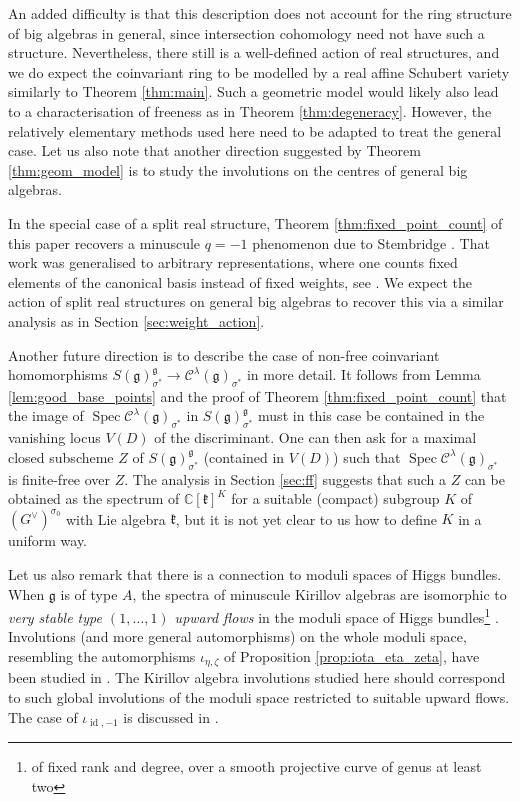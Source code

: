 \documentclass{amsart}
\newcommand{\C}{\mathbb{C}}
\newcommand{\Kir}{\mathcal{C}}
\newcommand{\g}{\mathfrak{g}}
\newcommand{\id}{\operatorname{id}}
\newcommand{\kay}{\mathfrak{k}}
\newcommand{\Spec}{\operatorname{Spec}}
\theoremstyle{definition}
\theoremstyle{plain}
\theoremstyle{remark}
\begin{document}
An added difficulty is that this description does not account for the ring structure of big algebras in general, since intersection cohomology need not have such a structure. Nevertheless, there still is a well-defined action of real structures, and we do expect the coinvariant ring to be modelled by a real affine Schubert variety similarly to Theorem \ref{thm:main}. Such a geometric model would likely also lead to a characterisation of freeness as in Theorem \ref{thm:degeneracy}.
However, the relatively elementary methods used here need to be adapted to treat the general case. Let us also note that another direction suggested by Theorem \ref{thm:geom_model} is to study the involutions on the centres of general big algebras.

In the special case of a split real structure, Theorem \ref{thm:fixed_point_count} of this paper recovers a minuscule $q=-1$ phenomenon due to Stembridge \cite{Stembridge1994_minuscule}. That work was generalised to arbitrary representations, where one counts fixed elements of the canonical basis instead of fixed weights, see \cite{Stembridge1996_canonical}. We expect the action of split real structures on general big algebras to recover this via a similar analysis as in Section \ref{sec:weight_action}. 

Another future direction is to describe the case of non-free coinvariant homomorphisms $S(\g)^\g_{\sigma^*} \to \Kir^\lambda(\g)_{\sigma^*}$ in more detail. It follows from Lemma \ref{lem:good_base_points} and the proof of Theorem \ref{thm:fixed_point_count} that the image of $\Spec \Kir^\lambda(\g)_{\sigma^*}$ in  $S(\g)^\g_{\sigma^*}$ must in this case be contained in the vanishing locus $V(D)$ of the discriminant. One can then ask for a maximal closed subscheme $Z$ of $S(\g)^\g_{\sigma^*}$ (contained in $V(D)$) such that $\Spec \Kir^\lambda(\g)_{\sigma^*}$ is finite-free over $Z$. The analysis in Section \ref{sec:ff} suggests that such a $Z$ can be obtained as the spectrum of $\C[\kay]^K$ for a suitable (compact) subgroup $K$ of $(G^\vee)^{\sigma_0}$ with Lie algebra $\kay$, but it is not yet clear to us how to define $K$ in a uniform way.

Let us also remark that there is a connection to moduli spaces of Higgs bundles. When $\g$ is of type $A$, the spectra of minuscule Kirillov algebras are isomorphic to \emph{very stable type $(1,\ldots, 1)$ upward flows} in the moduli space of Higgs bundles\footnote{of fixed rank and degree, over a smooth projective curve of genus at least two} \cite[\S4]{GH2024_even_very_stable}. Involutions (and more general automorphisms) on the whole moduli space, resembling the automorphisms $\iota_{\eta,\zeta}$ of Proposition \ref{prop:iota_eta_zeta}, have been studied in \cite{GPRa2019_involutions}. The Kirillov algebra involutions studied here should correspond to such global involutions of the moduli space restricted to suitable upward flows. The case of $\iota_{\id, -1}$ is discussed in \cite{GH2024_even_very_stable}. 
\end{document}
